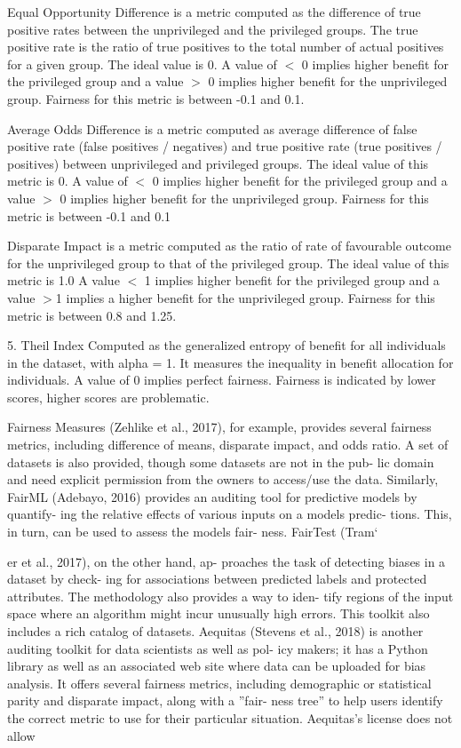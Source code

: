 \documentclass[final,5p,times,twocolumn]{elsarticle}
\begin{document}
Equal Opportunity Difference \cite{bellamy2018ai} is a metric computed as the difference of true positive rates between the unprivileged and the privileged groups. 
The true positive rate is the ratio of true positives to the total number of actual positives for a given group. The ideal value is 0. A value of $<$ 0 implies higher benefit for the privileged group and a value $>$ 0 implies higher benefit for the unprivileged group. Fairness for this metric is between -0.1 and 0.1.

Average Odds Difference \cite{bellamy2018ai} is a metric computed as average difference of false positive rate (false positives / negatives) and true positive rate (true positives / positives) between unprivileged and privileged groups.
The ideal value of this metric is 0. A value of $<$ 0 implies higher benefit for the privileged group and a value $>$ 0 implies higher benefit for the unprivileged group.
Fairness for this metric is between -0.1 and 0.1

Disparate Impact \cite{feldman2015disparate,bellamy2018ai} is a metric computed as the ratio of rate of favourable outcome for the unprivileged group to that of the privileged group.
The ideal value of this metric is 1.0 A value $<$ 1 implies higher benefit for the privileged group and a value $>$1 implies a higher benefit for the unprivileged group.
Fairness for this metric is between 0.8 and 1.25.

5. Theil Index \cite{conceicao2000theyoung,bellamy2018ai}
Computed as the generalized entropy of benefit for all individuals in the dataset, with alpha = 1. It measures the inequality in benefit allocation for individuals.
A value of 0 implies perfect fairness. Fairness is indicated by lower scores, higher scores are problematic.


 Fairness Measures (Zehlike et al., 2017), for example,
provides several fairness metrics, including difference of
means, disparate impact, and odds ratio. A set of datasets
is also provided, though some datasets are not in the pub-
lic domain and need explicit permission from the owners
to access/use the data. Similarly, FairML (Adebayo, 2016)
provides an auditing tool for predictive models by quantify-
ing the relative effects of various inputs on a models predic-
tions. This, in turn, can be used to assess the models fair-
ness. FairTest (Tram`

er et al., 2017), on the other hand, ap-
proaches the task of detecting biases in a dataset by check-
ing for associations between predicted labels and protected
attributes. The methodology also provides a way to iden-
tify regions of the input space where an algorithm might
incur unusually high errors. This toolkit also includes a
rich catalog of datasets. Aequitas (Stevens et al., 2018) is
another auditing toolkit for data scientists as well as pol-
icy makers; it has a Python library as well as an associated
web site where data can be uploaded for bias analysis. It
offers several fairness metrics, including demographic or
statistical parity and disparate impact, along with a ”fair-
ness tree” to help users identify the correct metric to use for
their particular situation. Aequitas’s license does not allow
\end{document}
